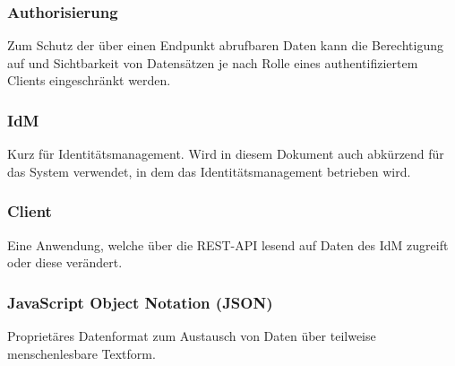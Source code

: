 \subsubsection*{Authorisierung}

Zum Schutz der über einen Endpunkt abrufbaren Daten kann die Berechtigung auf und Sichtbarkeit von Datensätzen je nach Rolle eines authentifiziertem Clients eingeschränkt werden.

\subsubsection*{IdM}
Kurz für Identitätsmanagement. Wird in diesem Dokument auch abkürzend für das System verwendet, in dem das Identitätsmanagement betrieben wird.

\subsubsection*{Client}

Eine Anwendung, welche über die REST-API lesend auf Daten des IdM zugreift oder diese verändert.

\subsubsection*{JavaScript Object Notation (JSON)}

Proprietäres Datenformat zum Austausch von Daten über teilweise menschenlesbare Textform.
